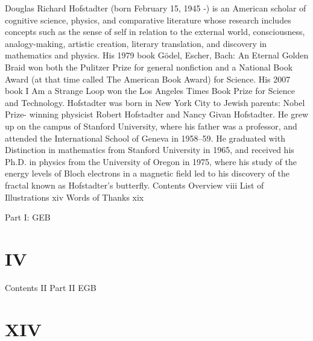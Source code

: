 

Douglas Richard Hofstadter (born February 15, 1945 -) is an American scholar of cognitive science, physics, and comparative literature whose research includes concepts such as the sense of self in relation to the external world, consciousness, analogy-making, artistic creation, literary translation, and discovery in mathematics and physics. His 1979 book Gödel, Escher, Bach: An Eternal Golden Braid won both the Pulitzer Prize for general nonfiction and a National Book Award (at that time called The American Book Award) for Science. His 2007 book I Am a Strange Loop won the Los Angeles Times Book Prize for Science and Technology. Hofstadter was born in New York City to Jewish parents: Nobel Prize- winning physicist Robert Hofstadter and Nancy Givan Hofstadter. He grew up on the campus of Stanford University, where his father was a professor, and attended the International School of Geneva in 1958–59. He graduated with Distinction in mathematics from Stanford University in 1965, and received his Ph.D. in physics from the University of Oregon in 1975, where his study of the energy levels of Bloch electrons in a magnetic field led to his discovery of the fractal known as Hofstadter's butterfly. Contents Overview                                                      viii List of Illustrations                                         xiv Words of Thanks                                               xix 

Part I: GEB 
\chapter {IV}








Contents                                                             II Part II EGB 


\chapter {XIV}












